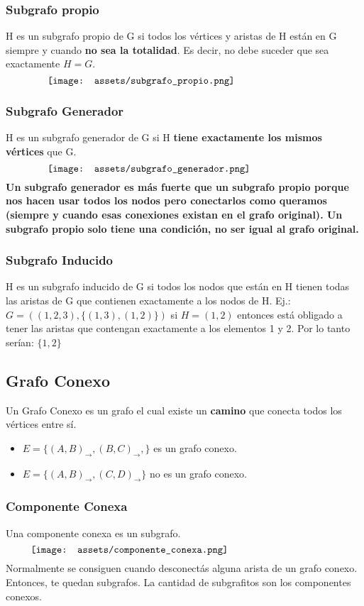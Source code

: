 \documentclass[10pt,a4paper]{article}
\begin{document}
\subsubsection*{Subgrafo propio}
H es un subgrafo propio de G si todos los vértices y aristas de H están en G siempre y cuando \textbf{no sea la totalidad}. Es decir, no debe suceder que sea exactamente $H = G$.
\[\begin{minipage}[b]{0.8\textwidth}
    \texttt{[image: assets/subgrafo\_propio.png]}
\end{minipage}\]
\subsubsection*{Subgrafo Generador}
H es un subgrafo generador de G si H \textbf{tiene exactamente los mismos vértices} que G. 
\[\begin{minipage}[b]{0.8\textwidth}
    \texttt{[image: assets/subgrafo\_generador.png]}
\end{minipage}\]
\textbf{Un subgrafo generador es más fuerte que un subgrafo propio porque nos hacen usar todos los nodos pero conectarlos como queramos (siempre y cuando esas conexiones existan en el grafo original). Un subgrafo propio solo tiene una condición, no ser igual al grafo original.}
\subsubsection*{Subgrafo Inducido}
H es un subgrafo inducido de G si todos los nodos que están en H tienen todas las aristas de G que contienen exactamente a los nodos de H. 
Ej.: $G = ((1, 2, 3), \{(1,3), (1,2)\})$ si $H = (1,2)$ entonces está obligado a tener las aristas que contengan exactamente a los elementos 1 y 2. Por lo tanto serían: $\{1, 2\}$ 
\subsection*{Grafo Conexo}
Un Grafo Conexo es un grafo el cual existe un \textbf{camino} que conecta todos los vértices entre sí. 
\begin{itemize}
    \item $E = \{(A,B)_{\rightarrow}, (B, C)_{\rightarrow}, \}$ es un grafo conexo.
    \item $E = \{(A, B)_{\rightarrow}, (C, D)_{\rightarrow}\}$ no es un grafo conexo.
\end{itemize}
\subsubsection*{Componente Conexa}
Una componente conexa es un subgrafo.
\[\begin{minipage}[b]{0.9\textwidth}
    \texttt{[image: assets/componente\_conexa.png]}
\end{minipage}\]
Normalmente se consiguen cuando desconectás alguna arista de un grafo conexo. Entonces, te quedan subgrafos. La cantidad de subgrafitos son los componentes conexos.
\end{document}
